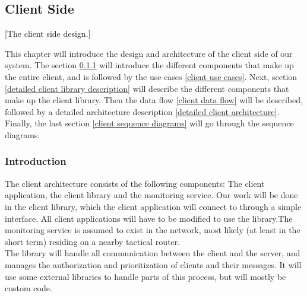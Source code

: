 \subsection{Client Side}\label{Client Side}
[The client side design.]

		This chapter will introduce the design and architecture of the client side of our system. The  section \ref{client introduction} will introduce the different components that make up the entire client, and is followed by the use cases \ref{client use cases}. Next, section \ref{detailed client library description} will describe the different components that make up the client library. Then the data flow \ref{client data flow} will be described, followed by a detailed architecture description \ref{detailed client architecture}. Finally, the last section \ref{client sequence diagrams} will go through the sequence diagrams.
		
    \subsubsection{Introduction}\label{client introduction}
		The client architecture consists of the following components: The client application, the client library and the monitoring service. Our work will be done in the client library, which the client application will connect to through a simple interface. All client applications will have to be modified to use the library.The monitoring service is assumed to exist in the network, most likely (at least in the short term) residing on a nearby tactical router.
\\
The library will handle all communication between the client and the server, and manages the authorization and prioritization of clients and their messages. It will use some external libraries to handle parts of this process, but will mostly be custom code.


